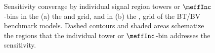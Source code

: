 \begin{figure}[h]
  \centering
    \caption{ 
     Sensitivity converage by individual signal region towers or $\meffInc$-bins in the 
    (a) the \dire and \xhalf grid, and in (b) the \DMtw, \DMth  grid of the BT/BV benchmark models. Dashed contours and shaded areas schematize the regions that the individual tower or $\meffInc$-bin addresses the sensitivity.}
    \label{fig::SRdefinition::towerCoverage1}
\end{figure}

